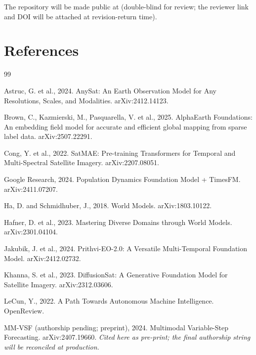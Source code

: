 \documentclass{article}
\begin{document}
The repository will be made public at  (double-blind for review; the reviewer link and DOI will be attached at revision-return time).


\section*{References}

\begin{thebibliography}{99}

Astruc, G. et al., 2024. AnySat: An Earth Observation Model for Any Resolutions, Scales, and Modalities. arXiv:2412.14123.

Brown, C., Kazmierski, M., Pasquarella, V. et al., 2025. AlphaEarth Foundations: An embedding field model for accurate and efficient global mapping from sparse label data. arXiv:2507.22291.

Cong, Y. et al., 2022. SatMAE: Pre-training Transformers for Temporal and Multi-Spectral Satellite Imagery. arXiv:2207.08051.

Google Research, 2024. Population Dynamics Foundation Model + TimesFM. arXiv:2411.07207.

Ha, D. and Schmidhuber, J., 2018. World Models. arXiv:1803.10122.

Hafner, D. et al., 2023. Mastering Diverse Domains through World Models. arXiv:2301.04104.

Jakubik, J. et al., 2024. Prithvi-EO-2.0: A Versatile Multi-Temporal Foundation Model. arXiv:2412.02732.

Khanna, S. et al., 2023. DiffusionSat: A Generative Foundation Model for Satellite Imagery. arXiv:2312.03606.

LeCun, Y., 2022. A Path Towards Autonomous Machine Intelligence. OpenReview.

MM-VSF (authorship pending; preprint), 2024. Multimodal Variable-Step Forecasting. arXiv:2407.19660. \emph{Cited here as pre-print; the final authorship string will be reconciled at production.}


\end{thebibliography}
\end{document}
